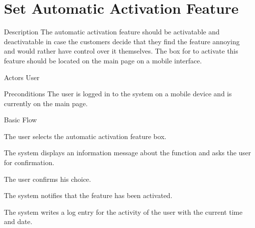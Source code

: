 \section{Set Automatic Activation Feature}

%
\begin{cpart}{Description}
The automatic activation feature should be activatable and deactivatable in case the customers decide that they find the feature annoying and would rather have control over it themselves. The box for to activate this feature should be located on the main page on a mobile interface.
\end{cpart}


%
\begin{cpart}{Actors}
User
\end{cpart}

%
\begin{cpart}{Preconditions}
The user is logged in to the system on a mobile device and is currently on the main page.
\end{cpart}

%
\begin{cpartList}{Basic Flow}
  \item The user selects the automatic activation feature box.
  \item The system displays an information message about the function and asks the user for confirmation.
  \item The user confirms his choice.
  \item The system notifies that the feature has been activated.
  \item The system writes a log entry for the activity of the user with the current time and date.
\end{cpartList}

\clearpage
